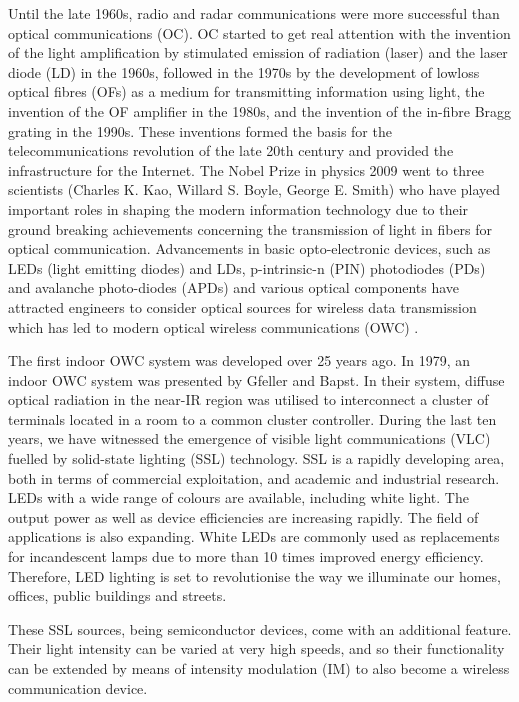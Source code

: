 Until the late 1960s, radio and radar communications were more successful than optical communications
(OC). OC started to get real attention with the invention of the light amplification by stimulated emission of
radiation (laser) and the laser diode (LD) in the 1960s, followed in the 1970s by the development of lowloss
optical fibres (OFs) as a medium for transmitting information using light, the invention of the OF amplifier in the 1980s, and the invention of the in-fibre Bragg grating in the 1990s. These inventions formed the basis for the telecommunications revolution of the late 20th century and provided the infrastructure for the Internet. The Nobel Prize in physics 2009 went to three scientists (Charles K. Kao, Willard S. Boyle,
George E. Smith) who have played important roles in shaping the modern information technology due to
their ground breaking achievements concerning the transmission of light in fibers for optical
communication. Advancements in basic opto-electronic devices, such as LEDs (light emitting diodes) and
LDs, p-intrinsic-n (PIN) photodiodes (PDs) and avalanche photo-diodes (APDs) and various optical
components have attracted engineers to consider optical sources for wireless data transmission which has
led to modern optical wireless communications (OWC) \cite{r17}.

The first indoor OWC system was developed over 25 years ago. In 1979, an indoor OWC system was
presented by Gfeller and Bapst. In their system, diffuse optical radiation in the near-IR region was
utilised to interconnect a cluster of terminals located in a room to a common cluster controller.
During the last ten years, we have witnessed the emergence of visible light communications (VLC) fuelled
by solid-state lighting (SSL) technology. SSL is a rapidly developing area, both in terms of commercial
exploitation, and academic and industrial research. LEDs with a wide range of colours are available,
including white light. The output power as well as device efficiencies are increasing rapidly. The field of
applications is also expanding. White LEDs are commonly used as replacements for incandescent lamps due
to more than 10 times improved energy efficiency. Therefore, LED lighting is set to revolutionise the way
we illuminate our homes, offices, public buildings and streets.

These SSL sources, being semiconductor devices, come with an additional feature. Their light intensity can
be varied at very high speeds, and so their functionality can be extended by means of intensity modulation
(IM) to also become a wireless communication device.

